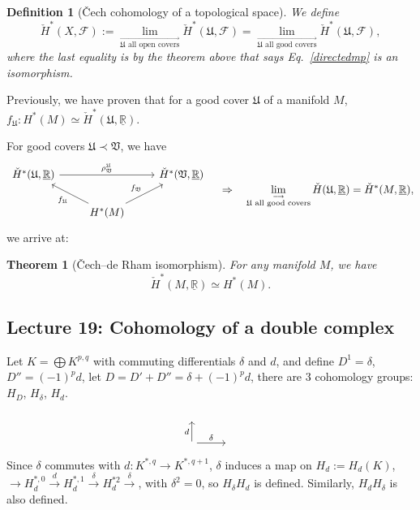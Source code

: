 \documentclass{article}
\theoremstyle{mystyle}
\newtheorem*{definition}{Definition}%
\newtheorem*{theorem*}{Theorem}
\theoremstyle{remark}
\numberwithin{equation}{section}
\begin{document}
\begin{definition}[Čech cohomology of a topological space] We define
$$\check{H}^*(X,\mathcal{F}):= \lim\limits_{\stackrel{\longrightarrow}{\mathfrak{U}\text{ all open covers}}}
\check{H}^*(\mathfrak{U},\mathcal{F}) =\lim\limits_{\stackrel{\longrightarrow}{\mathfrak{U}\text{ all good covers}}}
\check{H}^*(\mathfrak{U},\mathcal{F}),$$ 
where the last equality is by the theorem above that says Eq.~\eqref{directedmp} is an isomorphism.
\end{definition}


Previously, we have proven that for a good cover $\mathfrak{U}$ of a manifold $M$, 
$f_{\mathfrak{U}}\colon H^*(M)\simeq \check{H}^*(\mathfrak{U},\underline{\mathbb{R}})$.

For good covers $\mathfrak{U}\prec \mathfrak{V}$, 
we have
$$
\begin{tikzcd}
\check{H}^*(\mathfrak{U},\underline{\mathbb{R}}) \ar[rr,"\rho^{\mathfrak{U}}_{\mathfrak{V}}"]
&&\check{H}^*(\mathfrak{V},\underline{\mathbb{R}})\\
&\ar[ul,"f_{\mathfrak{U}}"] \ar[ur,"f_{\mathfrak{V}}"] H^*(M)&
\end{tikzcd}
~~~\Rightarrow ~~~ \lim_{\stackrel{\longrightarrow}{\mathfrak{U}\text{ all good covers}}} \check{H}(\mathfrak{U},\underline{\mathbb{R}}) = \check{H}^*(M,\underline{\mathbb{R}}),
$$
we arrive at:

\begin{theorem*}[Čech--de Rham isomorphism] For any manifold $M$, we have
$$\check{H}^*(M,\underline{\mathbb{R}})\simeq H^*(M).$$
\end{theorem*}

\subsection{Lecture 19: Cohomology of a double complex}

Let $K = \bigoplus K^{p,q}$ with commuting differentials $\delta$ and $d$, and define $D^1 = \delta$, $D'' = (-1)^pd$, let $D = D'+D'' = \delta + (-1)^pd$, there are 3 cohomology groups: $H_D$, $H_\delta$, $H_d$. 

$$
\begin{tikzcd}
~&\\
\ar[r,"\delta"] \ar[u,"d"] &~
\end{tikzcd}
$$
Since $\delta$ commutes with $d\colon K^{*,q}\rightarrow K^{*,q+1}$, $\delta $ induces a map on $H_d:= H_d(K)$, $\rightarrow H^{*,0}_d \xrightarrow{d} H^{*,1}_d\xrightarrow{\delta} H^{*2}_d\xrightarrow{\delta}$, with $\delta^2=0$, so $H_\delta H_d$ is defined. Similarly, $H_dH_\delta$ is also defined.
\end{document}
